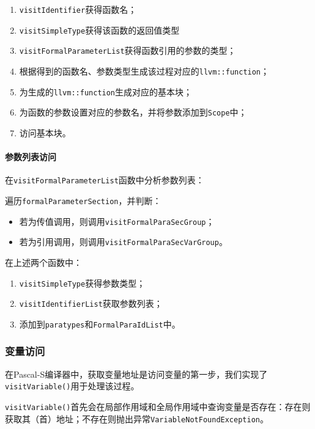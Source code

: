 \documentclass[lang=cn,11pt,a4paper,cite=authornum]{paper}
\begin{document}
\begin{enumerate}
    \item \texttt{visitIdentifier}获得函数名；
    \item \texttt{visitSimpleType}获得该函数的返回值类型
    \item \texttt{visitFormalParameterList}获得函数引用的参数的类型；
    \item 根据得到的函数名、参数类型生成该过程对应的\texttt{llvm::function}；
    \item 为生成的\texttt{llvm::function}生成对应的基本块；
    \item 为函数的参数设置对应的参数名，并将参数添加到\texttt{Scope}中；
    \item 访问基本块。
\end{enumerate}

\paragraph{参数列表访问} 在\texttt{visitFormalParameterList}函数中分析参数列表：

遍历\texttt{formalParameterSection}，并判断：

\begin{itemize}
    \item 若为传值调用，则调用\texttt{visitFormalParaSecGroup}；
    \item 若为引用调用，则调用\texttt{visitFormalParaSecVarGroup}。
\end{itemize}

在上述两个函数中：

\begin{enumerate}
    \item \texttt{visitSimpleType}获得参数类型；
    \item \texttt{visitIdentifierList}获取参数列表；
    \item 添加到\texttt{paratypes}和\texttt{FormalParaIdList}中。
\end{enumerate}

\subsubsection{变量访问}

在Pascal-S编译器中，获取变量地址是访问变量的第一步，我们实现了\texttt{visitVariable()}用于处理该过程。

\texttt{visitVariable()}首先会在局部作用域和全局作用域中查询变量是否存在：存在则获取其（首）地址；不存在则抛出异常\texttt{VariableNotFoundException}。
\end{document}
